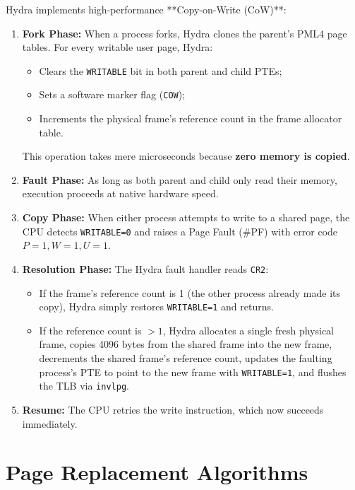 Hydra implements high-performance **Copy-on-Write (CoW)**:
\begin{enumerate}
    \item \textbf{Fork Phase:} When a process forks, Hydra clones the parent's PML4 page tables. For every writable user page, Hydra:
    \begin{itemize}
        \item Clears the \texttt{WRITABLE} bit in both parent and child PTEs;
        \item Sets a software marker flag (\texttt{COW});
        \item Increments the physical frame's reference count in the frame allocator table.
    \end{itemize}
    This operation takes mere microseconds because \textbf{zero memory is copied}.
    \item \textbf{Fault Phase:} As long as both parent and child only read their memory, execution proceeds at native hardware speed.
    \item \textbf{Copy Phase:} When either process attempts to write to a shared page, the CPU detects \texttt{WRITABLE=0} and raises a Page Fault (\#PF) with error code $P=1, W=1, U=1$.
    \item \textbf{Resolution Phase:} The Hydra fault handler reads \texttt{CR2}:
    \begin{itemize}
        \item If the frame's reference count is 1 (the other process already made its copy), Hydra simply restores \texttt{WRITABLE=1} and returns.
        \item If the reference count is $> 1$, Hydra allocates a single fresh physical frame, copies 4096 bytes from the shared frame into the new frame, decrements the shared frame's reference count, updates the faulting process's PTE to point to the new frame with \texttt{WRITABLE=1}, and flushes the TLB via \texttt{invlpg}.
    \end{itemize}
    \item \textbf{Resume:} The CPU retries the write instruction, which now succeeds immediately.
\end{enumerate}

\section{Page Replacement Algorithms}
\label{sec:page_replacement}

